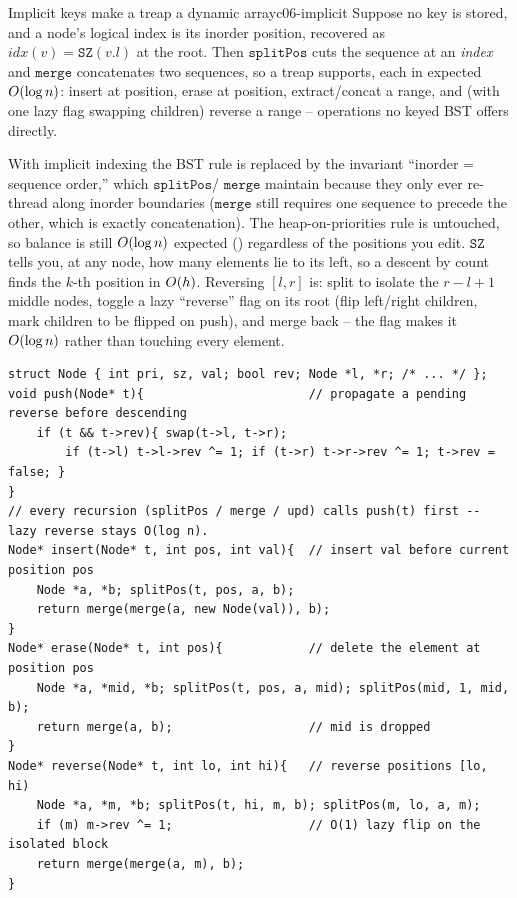 \begin{proposition}{Implicit keys make a treap a dynamic array}{c06-implicit}
Suppose no key is stored, and a node's logical index is its inorder position, recovered as
$\mathit{idx}(v)=\texttt{SZ}(v.l)$ at the root. Then $\texttt{splitPos}$ cuts the sequence at an
\emph{index} and $\texttt{merge}$ concatenates two sequences, so a treap supports, each in expected
$O(\log n)$: insert at position, erase at position, extract/concat a range, and (with one lazy flag
swapping children) reverse a range -- operations no keyed BST offers directly.
\end{proposition}
\begin{proofbox}
With implicit indexing the BST rule is replaced by the invariant ``inorder = sequence order,'' which
$\texttt{splitPos}$/ $\texttt{merge}$ maintain because they only ever re-thread along inorder boundaries
($\texttt{merge}$ still requires one sequence to precede the other, which is exactly concatenation). The
heap-on-priorities rule is untouched, so balance is still $O(\log n)$ expected
() regardless of the positions you edit. $\texttt{SZ}$ tells you, at any node, how
many elements lie to its left, so a descent by count finds the $k$-th position in $O(h)$. Reversing
$[l,r]$ is: split to isolate the $r-l+1$ middle nodes, toggle a lazy ``reverse'' flag on its root (flip
left/right children, mark children to be flipped on push), and merge back -- the flag makes it $O(\log
n)$ rather than touching every element. \end{proofbox}

\begin{lstlisting}[caption={Implicit sequence treap -- insert/erase by position and a lazy range reverse (skeleton)}, label={lst:c06-imp}]
struct Node { int pri, sz, val; bool rev; Node *l, *r; /* ... */ };
void push(Node* t){                       // propagate a pending reverse before descending
    if (t && t->rev){ swap(t->l, t->r);
        if (t->l) t->l->rev ^= 1; if (t->r) t->r->rev ^= 1; t->rev = false; }
}
// every recursion (splitPos / merge / upd) calls push(t) first -- lazy reverse stays O(log n).
Node* insert(Node* t, int pos, int val){  // insert val before current position pos
    Node *a, *b; splitPos(t, pos, a, b);
    return merge(merge(a, new Node(val)), b);
}
Node* erase(Node* t, int pos){            // delete the element at position pos
    Node *a, *mid, *b; splitPos(t, pos, a, mid); splitPos(mid, 1, mid, b);
    return merge(a, b);                   // mid is dropped
}
Node* reverse(Node* t, int lo, int hi){   // reverse positions [lo, hi)
    Node *a, *m, *b; splitPos(t, hi, m, b); splitPos(m, lo, a, m);
    if (m) m->rev ^= 1;                   // O(1) lazy flip on the isolated block
    return merge(merge(a, m), b);
}
\end{lstlisting}

